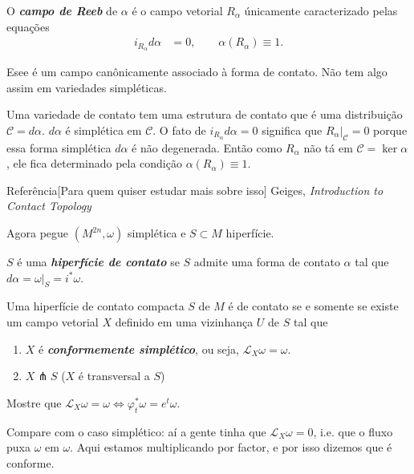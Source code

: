 \begin{defn}\leavevmode
	O \textit{\textbf{campo de Reeb}} de $\alpha$ é o campo vetorial $R_\alpha$ únicamente caracterizado pelas equações 
	\begin{align*}
		i_{R_\alpha}d \alpha&=0,\qquad \alpha(R_\alpha)\equiv 1.
	\end{align*}
\end{defn}

\begin{remark}\leavevmode
	Esee é um campo canônicamente associado à forma de contato. Não tem algo assim em variedades simpléticas.
\end{remark}

\begin{remark}[dani]\leavevmode
Uma variedade de contato tem uma estrutura de contato que é uma distribuição $\mathcal{C}=d\alpha$. $d\alpha$ é simplética em $\mathcal{C}$. O fato de $i_{R_\alpha}d\alpha=0$ significa que $R_\alpha|_{\mathcal{C}}=0$ porque essa forma simplética $d\alpha$ é não degenerada. Então como $R_\alpha$ não tá em $\mathcal{C}=\ker \alpha$, ele fica determinado pela condição $\alpha(R_\alpha)\equiv 1$.
\end{remark}

\begin{thing4}{Referência}[Para quem quiser estudar mais sobre isso]\leavevmode
	Geiges, \textit{Introduction to Contact Topology} 
\end{thing4}

Agora pegue $(M^{2n},\omega)$ simplética e $S\subset M$ hiperfície.

\begin{defn}\leavevmode
	$S$ é uma \textit{\textbf{hiperfície de contato}} se  $S$ admite uma forma de contato $\alpha$ tal que $d\alpha=\omega|_{S}=i^*\omega$.
\end{defn}

\begin{thm}\leavevmode
	Uma hiperfície de contato compacta $S$ de $M$ é de contato se e somente se existe um campo vetorial $X$ definido em uma vizinhança $U$ de $S$ tal que
	\begin{enumerate}
		\item $X$ é \textit{\textbf{conformemente simplético}}, ou seja, $\mathcal{L}_X\omega=\omega$.
		\item $X\pitchfork S$ ($X$ é transversal a $S$)
	\end{enumerate}
\end{thm}

\begin{exercise}\leavevmode
	 Mostre que  $\mathcal{L}_X\omega=\omega\iff \varphi_t^*\omega=e^t \omega$.

	 Compare com o caso simplético: aí a gente tinha que $\mathcal{L}_X\omega=0$, i.e. que o fluxo puxa $\omega$ em $\omega$. Aqui estamos multiplicando por factor, e por isso dizemos que é conforme.
\end{exercise}

